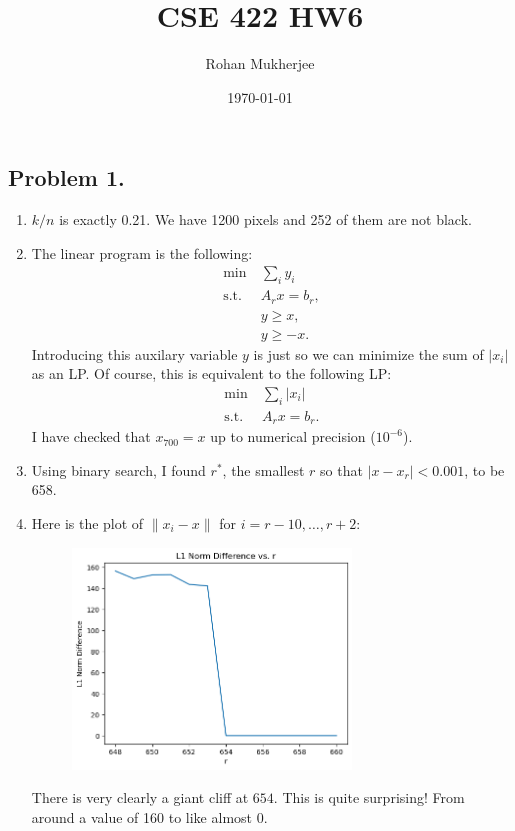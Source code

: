 \documentclass[12pt]{article}
\title{CSE 422 HW6}
\date{\today}
\author{Rohan Mukherjee}
\newcommand{\mg}[1]{\| #1 \|}
\begin{document}
    \maketitle
    \subsection*{Problem 1.}
    \begin{enumerate}[label=(\alph*)]
        \item $k/n$ is exactly 0.21. We have 1200 pixels and 252 of them are not black.
        \item The linear program is the following:
        \begin{align*}
            \min \ & \sum_i y_i \\
            \text{s.t.} \ & A_r x = b_r, \\
                          & y \geq x, \\
                          & y \geq -x.
        \end{align*} 
        Introducing this auxilary variable $y$ is just so we can minimize the sum of $|x_i|$ as an LP. Of course, this is equivalent to the following LP:
        \begin{align*}
            \min \ & \sum_i |x_i| \\
            \text{s.t.} \ & A_r x = b_r.
        \end{align*}    
        I have checked that $x_{700} = x$ up to numerical precision ($10^{-6}$).
        \item Using binary search, I found $r^*$, the smallest $r$ so that $|x - x_r| < 0.001$, to be 658.

        \item Here is the plot of $\mg{x_i-x}$ for $i = r-10, \ldots, r+2$:
        \begin{figure}[H]
            \centering
            \includegraphics[width=0.7\textwidth]{sharp_dropoff.png}
        \end{figure}
        There is very clearly a giant cliff at $654$. This is quite surprising! From around a value of 160 to like almost 0.


\end{enumerate}
\end{document}
